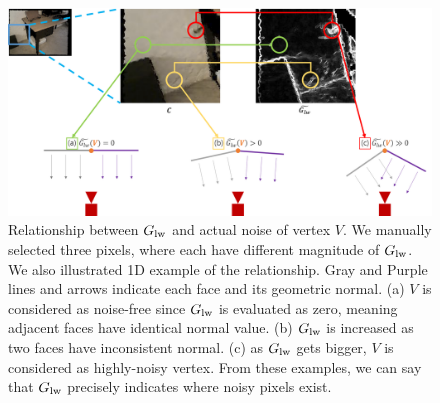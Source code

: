 \begin{figure}
    \centering
    \includegraphics[width=\textwidth]{figures/3_method_relationship_gradient_lightweight_and_noise_full_tone_changed.png}
    \caption{Relationship between $G\textsubscript{lw}$ and actual noise of vertex $V$. We manually selected three pixels, where each have different magnitude of $G\textsubscript{lw}$. We also illustrated 1D example of the relationship. Gray and Purple lines and arrows indicate each face and its geometric normal. (a) $V$ is considered as noise-free since $G\textsubscript{lw}$ is evaluated as zero, meaning adjacent faces have identical normal value. (b) $G\textsubscript{lw}$ is increased as two faces have inconsistent normal. (c) as $G\textsubscript{lw}$ gets bigger, $V$ is considered as highly-noisy vertex. From these examples, we can say that $G\textsubscript{lw}$ precisely indicates where noisy pixels exist.}
    \label{fig:relationship_gradient_lightweight_and_noise}
\end{figure}


